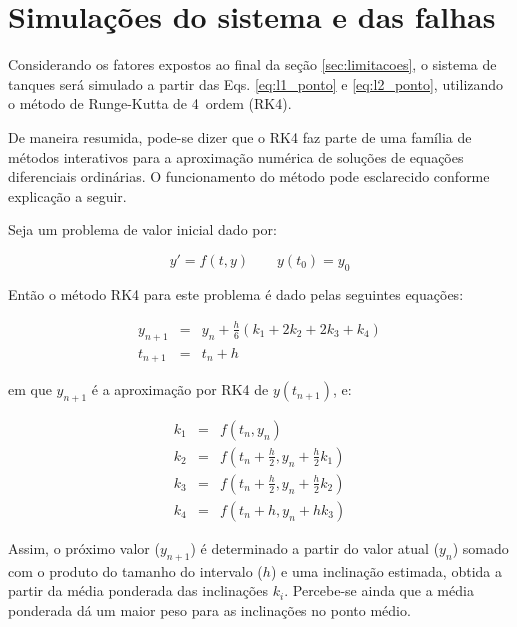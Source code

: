 \section{Simulações do sistema e das falhas}
Considerando os fatores expostos ao final da seção \ref{sec:limitacoes}, o
sistema de tanques será simulado a partir das Eqs. \ref{eq:l1_ponto} e
\ref{eq:l2_ponto}, utilizando o método de Runge-Kutta de 4\textordfeminine\
ordem (RK4).


De maneira resumida, pode-se dizer que o RK4 faz parte de uma família de métodos
interativos para a aproximação numérica de soluções de equações diferenciais
ordinárias. O funcionamento do método pode esclarecido conforme explicação a
seguir. 

Seja um problema de valor inicial dado por:

\begin{equation}\label{eq:}
y' = f(t,y) \qquad y(t_0) = y_0
\end{equation}

Então o método RK4 para este problema é dado pelas seguintes equações:

\begin{eqnarray}
y_{n+1} & = & y_n + \frac{h}{6}\left(k_1 + 2k_2 + 2k_3 + k_4\right)\\
t_{n+1} & = & t_n + h
\end{eqnarray}

\noindent em que $y_{n+1}$ é a aproximação por RK4 de $y(t_{n + 1})$, e:

\begin{eqnarray}
k_1 & = & f\left(t_n,y_n\right)\\
k_2 & = & f\left(t_n+\frac{h}{2},y_n+\frac{h}{2}k_1\right)\\
k_3 & = & f\left(t_n+\frac{h}{2},y_n+\frac{h}{2}k_2\right)\\
k_4 & = & f\left(t_n+h,y_n+hk_3\right)
\end{eqnarray}

Assim, o próximo valor ($y_{n+1}$) é determinado a partir do valor atual ($y_n$)
somado com o produto do tamanho do intervalo ($h$) e uma inclinação estimada,
obtida a partir da média ponderada das inclinações $k_i$. Percebe-se ainda que a
média ponderada dá um maior peso para as inclinações no ponto médio.

